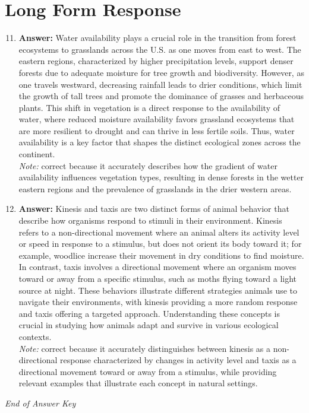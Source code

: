 \documentclass[12pt]{article}
\begin{document}
\section*{Long Form Response}
\begin{enumerate}[label=\arabic*.]
\setcounter{enumi}{10}
\item \textbf{Answer:} Water availability plays a crucial role in the transition from forest ecosystems to grasslands across the U.S. as one moves from east to west. The eastern regions, characterized by higher precipitation levels, support denser forests due to adequate moisture for tree growth and biodiversity. However, as one travels westward, decreasing rainfall leads to drier conditions, which limit the growth of tall trees and promote the dominance of grasses and herbaceous plants. This shift in vegetation is a direct response to the availability of water, where reduced moisture availability favors grassland ecosystems that are more resilient to drought and can thrive in less fertile soils. Thus, water availability is a key factor that shapes the distinct ecological zones across the continent.
\\ \textit{Note:} correct because it accurately describes how the gradient of water availability influences vegetation types, resulting in dense forests in the wetter eastern regions and the prevalence of grasslands in the drier western areas.
\item \textbf{Answer:} Kinesis and taxis are two distinct forms of animal behavior that describe how organisms respond to stimuli in their environment. Kinesis refers to a non-directional movement where an animal alters its activity level or speed in response to a stimulus, but does not orient its body toward it; for example, woodlice increase their movement in dry conditions to find moisture. In contrast, taxis involves a directional movement where an organism moves toward or away from a specific stimulus, such as moths flying toward a light source at night. These behaviors illustrate different strategies animals use to navigate their environments, with kinesis providing a more random response and taxis offering a targeted approach. Understanding these concepts is crucial in studying how animals adapt and survive in various ecological contexts.
\\ \textit{Note:} correct because it accurately distinguishes between kinesis as a non-directional response characterized by changes in activity level and taxis as a directional movement toward or away from a stimulus, while providing relevant examples that illustrate each concept in natural settings.
\end{enumerate}

\vfill
\noindent\textit{End of Answer Key}
\end{document}
